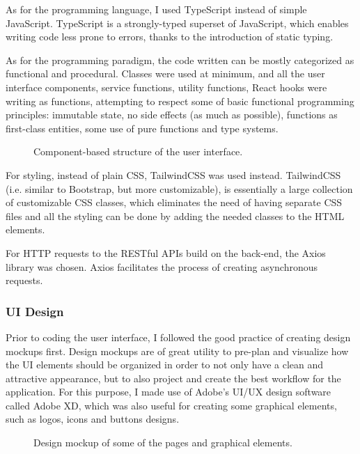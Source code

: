   As for the programming language, I used TypeScript instead of simple JavaScript. TypeScript is a strongly-typed superset of JavaScript, which enables writing code less prone to errors, thanks to the introduction of static typing. 

  As for the programming paradigm, the code written can be mostly categorized as functional and procedural. Classes were used at minimum, and all the user interface components, service functions, utility functions, React hooks were writing as functions, attempting to respect some of basic functional programming principles: immutable state, no side effects (as much as possible), functions as first-class entities, some use of pure functions and type systems.

  \begin{figure}[H]
    \centering
    \caption{Component-based structure of the user interface.}
  \end{figure}
  
  For styling, instead of plain CSS, TailwindCSS was used instead. TailwindCSS (i.e. similar to Bootstrap, but more customizable), is essentially a large collection of customizable CSS classes, which eliminates the need of having separate CSS files and all the styling can be done by adding the needed classes to the HTML elements.

  For HTTP requests to the RESTful APIs build on the back-end, the Axios library was chosen. Axios facilitates the process of creating asynchronous requests. 

\subsubsection{UI Design}
  Prior to coding the user interface, I followed the good practice of creating design mockups first. Design mockups are of great utility to pre-plan and visualize how the UI elements should be organized in order to not only have a clean and attractive appearance, but to also project and create the best workflow for the application. For this purpose, I made use of Adobe's UI/UX design software called Adobe XD, which was also useful for creating some graphical elements, such as logos, icons and buttons designs.

  \begin{figure}[H]
    \centering
    \caption{Design mockup of some of the pages and graphical elements.}
  \end{figure}

